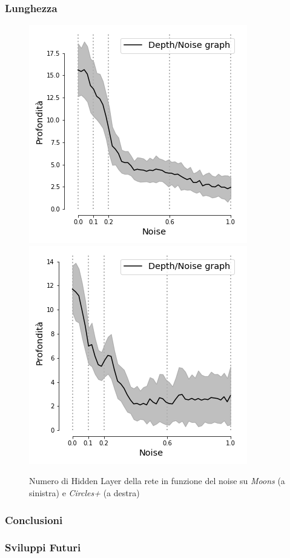 \documentclass{beamer}
\begin{document}
\begin{frame}
 \frametitle{Lunghezza}
 \begin{figure}
 \includegraphics[scale = 0.42]{images/depth_noise_moons.png}
 \includegraphics[scale = 0.42]{images/depth_noise_circles+.png}
 \caption{\large Numero di Hidden Layer della rete in funzione del noise su \textit{Moons} (a sinistra) e \textit{Circles+} (a destra)}
 
 \end{figure}
\end{frame}

\begin{frame}
 \frametitle{Conclusioni}
\end{frame}

\begin{frame}
 \frametitle{Sviluppi Futuri}
\end{frame}
\end{document}
